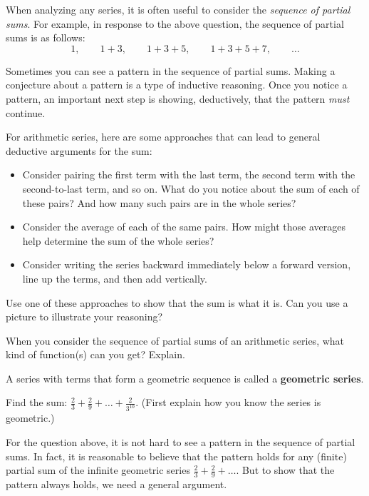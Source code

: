 When analyzing any series, it is often useful to consider the \emph{sequence of partial sums}.  For example, in response to the above question, the sequence of partial sums is as follows:  $$1, \qquad 1 + 3, \qquad 1+ 3+5, \qquad 1+3+5+7, \qquad \dots$$

Sometimes you can see a pattern in the sequence of partial sums.  Making a conjecture about a pattern is a type of inductive reasoning.  Once you notice a pattern, an important next step is showing, deductively, that the pattern \emph{must} continue.  

For arithmetic series, here are some approaches that can lead to general deductive arguments for the sum: 

\begin{itemize}
\item Consider pairing the first term with the last term, the second term with the second-to-last term, and so on.  What do you notice about the sum of each of these pairs?  And how many such pairs are in the whole series?  
\item Consider the average of each of the same pairs.  How might those averages help determine the sum of the whole series?  
\item Consider writing the series backward immediately below a forward version, line up the terms, and then add vertically.  
\end{itemize}

\begin{question}
Use one of these approaches to show that the sum is what it is.  Can you use a picture to illustrate your reasoning?    
\end{question}
\QM

\begin{question}
When you consider the sequence of partial sums of an arithmetic series, what kind of function(s) can you get?  Explain.  
\end{question} 
\QM

\begin{definition}
A series with terms that form a geometric sequence is called a \textbf{geometric series}.  
\end{definition}

\begin{question}
Find the sum:  $\frac{2}{3}+\frac{2}{9}+\dots+\frac{2}{3^{10}}$.  (First explain how you know the series is geometric.)
\end{question}
\QM

For the question above, it is not hard to see a pattern in the sequence of partial sums.  In fact, it is reasonable to believe that the pattern holds for any (finite) partial sum of the infinite geometric series $\frac{2}{3}+\frac{2}{9}+\dots$.  But to show that the pattern always holds, we need a general argument.  


